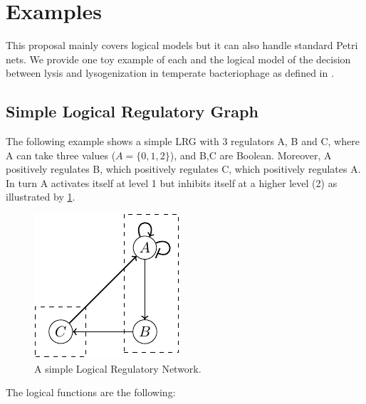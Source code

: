 
\section{Examples}
\label{examples}


This proposal mainly covers logical models but it can also handle standard Petri nets. We provide one toy example of each and the logical model of the decision between lysis and lysogenization in temperate bacteriophage as defined in \cite{thieffry95}.

\subsection{Simple Logical Regulatory Graph} %
\label{sub:lrg}
The following example shows a simple LRG with 3 regulators A, B and C, where A can take three values ($A=\{0,1,2\}$), and B,C are Boolean. Moreover, A positively regulates B, which positively regulates C, which positively regulates A. In turn A activates itself at level 1 but inhibits itself at a higher level (2) as illustrated by \ref{ex-lrg}.

\begin{figure}[hb]
  \includegraphics{figs/LRG.pdf}
  \caption{A simple Logical Regulatory Network.}
  \label{ex-lrg}
\end{figure}


The logical functions are the following:

